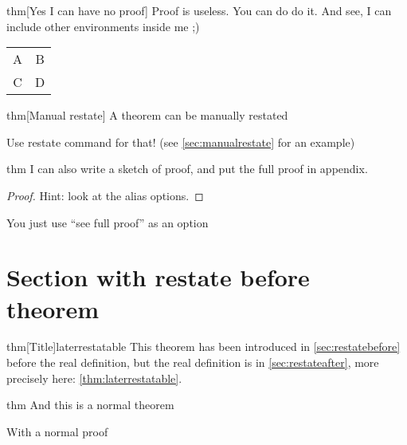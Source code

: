 \documentclass{article}
\begin{document}
\begin{theoremEnd}[]{thm}[Yes I can have no proof]
  Proof is useless. You can do do it. And see, I can include other environments inside me ;)\\
  \begin{tabular}{ c c } 
    A & B \\ 
    C & D \\ 
  \end{tabular}
\end{theoremEnd}


\begin{theoremEnd}[restate command=mymanualrestate]{thm}[Manual restate]
  A theorem can be manually restated  
\end{theoremEnd}
\begin{proofEnd}
  Use restate command for that! (see \autoref{sec:manualrestate} for an example)
\end{proofEnd}

\begin{theoremEnd}{thm}
  I can also write a sketch of proof, and put the full proof in appendix.
\end{theoremEnd}
\begin{proof}
  Hint: look at the alias options.
\end{proof}
\begin{proofEnd}
  You just use ``see full proof'' as an option
\end{proofEnd}

\section{Section with restate before theorem}\label{sec:restatebefore}

\begin{theoremEndRestateBefore}{thm}[Title]{laterrestatable}
  \label{thm:laterrestatable}
  This theorem has been introduced in \autoref{sec:restatebefore} before the real definition, but the real definition is in \autoref{sec:restateafter}, more precisely here: \autoref{thm:laterrestatable}.
\end{theoremEndRestateBefore}


\begin{theoremEnd}{thm}
  And this is a normal theorem  
\end{theoremEnd}
\begin{proofEnd}
  With a normal proof  
\end{proofEnd}
\end{document}

